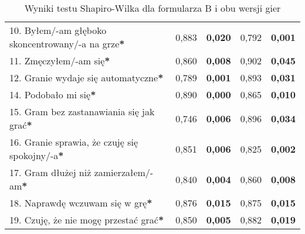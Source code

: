 \begin{table}[!h]
\begin{center}
\begin{tabular}{|m{10em}|m{5em}|m{5em}|m{5em}|m{5em}|}
            10. Byłem/-am głęboko \newline skoncentrowany/-a \newline na grze\textbf{*} & 0,883                       & \textbf{0,020}   & 0,792                   & \textbf{0,001} \\
            11. Zmęczyłem/-am się\textbf{*}                                             & 0,860                       & \textbf{0,008}   & 0,902                   & \textbf{0,045} \\
            12. Granie wydaje się automatyczne\textbf{*}                                & 0,789                       & \textbf{0,001}   & 0,893                   & \textbf{0,031} \\
            14. Podobało mi się\textbf{*}                                               & 0,890                       & \textbf{0,000}   & 0,865                   & \textbf{0,010} \\
            15. Gram bez zastanawiania się jak grać\textbf{*}                           & 0,746                       & \textbf{0,006}   & 0,896                   & \textbf{0,034} \\
            16. Granie sprawia, \newline że czuję się spokojny/-a\textbf{*}             & 0,851                       & \textbf{0,006}   & 0,825                   & \textbf{0,002} \\
            17. Gram dłużej \newline niż zamierzałem/-am\textbf{*}                      & 0,840                       & \textbf{0,004}   & 0,860                   & \textbf{0,008} \\
            18. Naprawdę wczuwam się w grę\textbf{*}                                    & 0,876                       & \textbf{0,015}   & 0,875                   & \textbf{0,015} \\
            19. Czuję, że nie mogę przestać grać\textbf{*}                              & 0,850                       & \textbf{0,005}   & 0,882                   & \textbf{0,019} \\
            \hline
        \end{tabular}
    \end{center}
    \caption{Wyniki testu Shapiro-Wilka dla formularza B i obu wersji gier}\label{tab1:ch7_11}
\end{table}

